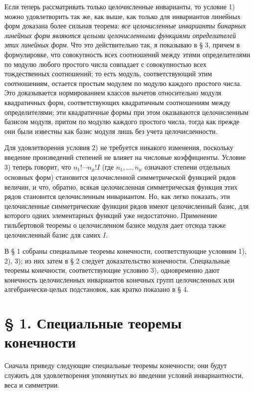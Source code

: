 \documentclass[11pt]{article}
\begin{document}
Если теперь рассматривать только целочисленные инварианты, то условие 1) можно удовлетворить так же, как выше, как только для инвариантов линейных форм доказана более сильная теорема: \emph{все целочисленные инварианты бинарных линейных форм являются целыми целочисленными функциями определителей этих линейных форм}. Что это действительно так, я показываю в § 3, причем в формулировке, что совокупность всех соотношений между этими определителями по модулю любого простого числа совпадает с совокупностью всех тождественных соотношений; то есть модуль, соответствующий этим соотношениям, остается простым модулем по модулю каждого простого числа. Это доказывается нормированием классов вычетов относительно модуля квадратичных форм, соответствующих квадратичным соотношениям между определителями; эти квадратичные формы при этом оказываются целочисленным базисом модуля, притом по модулю каждого простого числа, тогда как прежде они были известны как базис модуля лишь без учета целочисленности.

Для удовлетворения условия 2) не требуется никакого изменения, поскольку введение произведений степеней не влияет на числовые коэффициенты. Условие 3) теперь говорит, что \(n_1!\cdots n_\mu! I\) (где \(n_1,\ldots,n_\mu\) означают степени отдельных основных форм) становится целочисленной симметрической функцией рядов величин, и что, обратно, всякая целочисленная симметрическая функция этих рядов становится целочисленным инвариантом. Но, как легко показать, эти целочисленные симметрические функции рядов имеют целочисленный базис, для которого одних элементарных функций уже недостаточно. Применение гильбертовой теоремы о целочисленном базисе модуля дает отсюда также целочисленный базис для самих \(I\).

В § 1 собраны специальные теоремы конечности, соответствующие условиям 1), 2), 3); из них затем в § 2 следует доказательство конечности. Специальные теоремы конечности, соответствующие условию 3), одновременно дают конечность целочисленных инвариантов конечных групп целочисленных или алгебраически-целых подстановок, как кратко показано в § 4.

\section*{§ 1. Специальные теоремы конечности}

Сначала приведу следующие специальные теоремы конечности; они будут служить для удовлетворения упомянутых во введении условий инвариантности, веса и симметрии.
\end{document}
